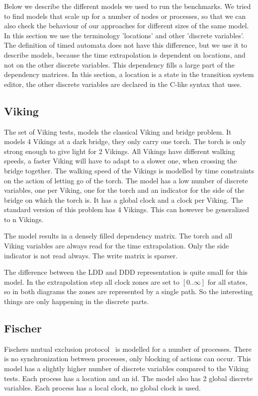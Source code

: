 Below we describe the different models we used to run the benchmarks. We tried to find models that scale up for a number of nodes or processes, so that we can also check the behaviour of our approaches for different sizes of the same model. In this section we use the terminology 'locations' and other 'discrete variables'. The definition of timed automata does not have this difference, but we use it to describe models, because the time extrapolation is dependent on locations, and not on the other discrete variables. This dependency fills a large part of the dependency matrices. In this section, a location is a state in the \uppaal{} transition system editor, the other discrete variables are declared in the C-like syntax that \uppaal{} uses.

\subsection{Viking}
The set of Viking tests, models the classical Viking and bridge problem. It models 4 Vikings at a dark bridge, they only carry one torch. The torch is only strong enough to give light for 2 Vikings. All Vikings have different walking speeds, a faster Viking will have to adapt to a slower one, when crossing the bridge together. The walking speed of the Vikings is modelled by time constraints on the action of letting go of the torch. The model has a low number of discrete variables, one per Viking, one for the torch and an indicator for the side of the bridge on which the torch is. It has a global clock and a clock per Viking. The standard version of this problem has 4 Vikings. This can however be generalized to n Vikings.

The model results in a densely filled dependency matrix. The torch and all Viking variables are always read for the time extrapolation. Only the side indicator is not read always. The write matrix is sparser. 

The difference between the LDD and DDD representation is quite small for this model. In the extrapolation step all clock zones are set to $[0..\infty]$ for all states, so in both diagrams the zones are represented by a single path. So the interesting things are only happening in the discrete parts.

\subsection{Fischer}
Fischers mutual exclusion protocol~\cite{Lamport:1987:FME:7351.7352} is modelled for a number of processes. There is no synchronization between processes, only blocking of actions can occur. This model has a slightly higher number of discrete variables compared to the Viking tests. Each process has a location and an id. The model also has 2 global discrete variables. Each process has a local clock, no global clock is used.

